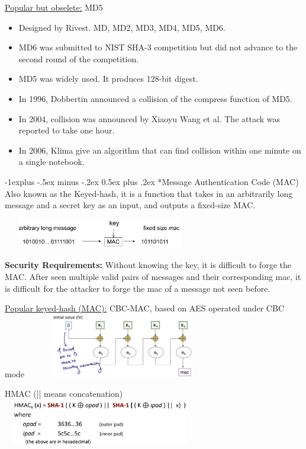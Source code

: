 \documentclass[10pt,landscape]{article}
\makeatletter
\renewcommand{\subsection}{\@startsection{subsection}{2}{0mm}%
                                {-1explus -.5ex minus -.2ex}%
                                {0.5ex plus .2ex}%
                                {\normalfont\normalsize\bfseries}}
\makeatother
\begin{document}
\begin{multicols*}{3}
\underline{Popular but obselete:} MD5
\begin{itemize}
    \item Designed by Rivest. MD, MD2, MD3, MD4, MD5, MD6.
    \item MD6 was submitted to NIST SHA-3 competition but did not advance to the
    second round of the competition.
    \item MD5 was widely used. It produces 128-bit digest.
    \item In 1996, Dobbertin announced a collision of the compress function of MD5.
    \item In 2004, collision was announced by Xiaoyu Wang et al. The attack was reported
    to take one hour.
    \item In 2006, Klima give an algorithm that can find collision within one minute on a
    single notebook. 
\end{itemize}

\subsection*{Message Authentication Code (MAC)}
Also known as the Keyed-hash, it is a function that takes in an arbitrarily long message and a secret key as an input, and outputs a fixed-size MAC.

\includegraphics*[height=1.3cm, width=8.5cm]{images/MAC.png}

\textbf{Security Requirements:} Without knowing the key, it is difficult to forge the MAC.
After seen multiple valid pairs of messages and their corresponding mac, it is difficult
for the attacker to forge the mac of a message not seen before. 

\pagebreak


\underline{Popular keyed-hash (MAC):} CBC-MAC, based on AES operated under CBC mode
\includegraphics*[height=2.8cm, width=8.5cm]{images/cbcmac.png}

HMAC (|| means concatenation)
\includegraphics*[height=2cm, width=8.5cm]{images/hmac.png}


\end{multicols*}
\end{document}
